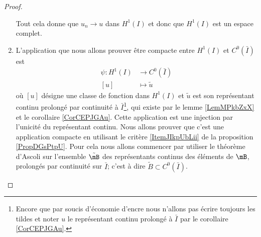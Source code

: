 \begin{proof}
\begin{enumerate}
            
            Tout cela donne que \( u_n\to u\) dans \( H^1(I)\) et donc que \( H^1(I)\) est un espace complet.

        \item

            L'application que nous allons prouver être compacte entre \( H^1(I)\) et \( C^0(\bar I)\) est
            \begin{equation}
                \begin{aligned}
                    \psi\colon H^1(I)&\to C^0(\bar I) \\
                    [u]&\mapsto \tilde u 
                \end{aligned}
            \end{equation}
            où \( [u]\) désigne une classe de fonction dans \( H^1(I)\) et \( \tilde u\) est son représentant continu prolongé par continuité à \( \bar I\)\footnote{Encore que par soucis d'économie d'encre nous n'allons pas écrire toujours les tildes et noter \( u\) le représentant continu prolongé à \( \bar I\) par le corollaire \ref{CorCEPJGAu}.}, qui existe par le lemme \ref{LemMPkbZxX} et le corollaire \ref{CorCEPJGAu}. Cette application est une injection par l'unicité du représentant continu. Nous allons prouver que c'est une application compacte en utilisant le critère \ref{ItemJIkpUbLii} de la proposition \ref{PropDGsPtpU}. Pour cela nous allons commencer par utiliser le théorème d'Ascoli sur l'ensemble \( \tilde \mB\) des représentants continus des éléments de \( \mB\), prolongés par continuité sur \( \bar I\); c'est à dire \( \tilde B\subset C^0(\bar I)\).


\end{enumerate}
\end{proof}
